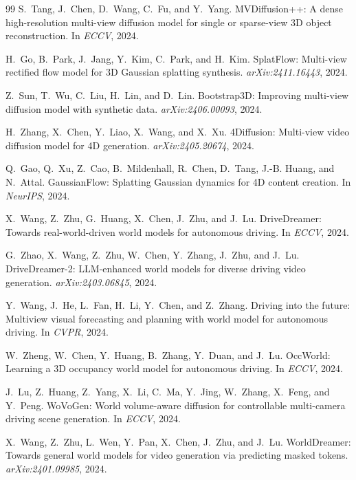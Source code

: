\begin{thebibliography}{99}
S.~Tang, J.~Chen, D.~Wang, C.~Fu, and Y.~Yang.
{MVDiffusion++}: A dense high-resolution multi-view diffusion model for single or sparse-view 3{D} object reconstruction.
In \emph{ECCV}, 2024.

H.~Go, B.~Park, J.~Jang, Y.~Kim, C.~Park, and H.~Kim.
{SplatFlow}: Multi-view rectified flow model for 3{D} Gaussian splatting synthesis.
\emph{arXiv:2411.16443}, 2024.

Z.~Sun, T.~Wu, C.~Liu, H.~Lin, and D.~Lin.
{Bootstrap3D}: Improving multi-view diffusion model with synthetic data.
\emph{arXiv:2406.00093}, 2024.

H.~Zhang, X.~Chen, Y.~Liao, X.~Wang, and X.~Xu.
{4Diffusion}: Multi-view video diffusion model for 4{D} generation.
\emph{arXiv:2405.20674}, 2024.

Q.~Gao, Q.~Xu, Z.~Cao, B.~Mildenhall, R.~Chen, D.~Tang, J.-B. Huang, and N.~Attal.
{GaussianFlow}: Splatting Gaussian dynamics for 4{D} content creation.
In \emph{NeurIPS}, 2024.

X.~Wang, Z.~Zhu, G.~Huang, X.~Chen, J.~Zhu, and J.~Lu.
{DriveDreamer}: Towards real-world-driven world models for autonomous driving.
In \emph{ECCV}, 2024.

G.~Zhao, X.~Wang, Z.~Zhu, W.~Chen, Y.~Zhang, J.~Zhu, and J.~Lu.
{DriveDreamer-2}: {LLM}-enhanced world models for diverse driving video generation.
\emph{arXiv:2403.06845}, 2024.

Y.~Wang, J.~He, L.~Fan, H.~Li, Y.~Chen, and Z.~Zhang.
Driving into the future: Multiview visual forecasting and planning with world model for autonomous driving.
In \emph{CVPR}, 2024.

W.~Zheng, W.~Chen, Y.~Huang, B.~Zhang, Y.~Duan, and J.~Lu.
{OccWorld}: Learning a 3{D} occupancy world model for autonomous driving.
In \emph{ECCV}, 2024.

J.~Lu, Z.~Huang, Z.~Yang, X.~Li, C.~Ma, Y.~Jing, W.~Zhang, X.~Feng, and Y.~Peng.
{WoVoGen}: World volume-aware diffusion for controllable multi-camera driving scene generation.
In \emph{ECCV}, 2024.

X.~Wang, Z.~Zhu, L.~Wen, Y.~Pan, X.~Chen, J.~Zhu, and J.~Lu.
{WorldDreamer}: Towards general world models for video generation via predicting masked tokens.
\emph{arXiv:2401.09985}, 2024.


\end{thebibliography}
